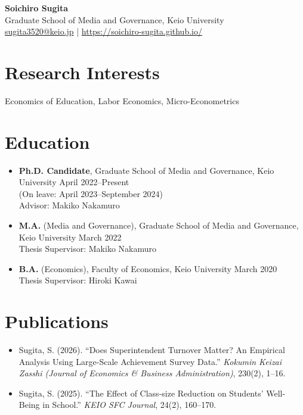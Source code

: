 \documentclass[11pt, a4paper]{article}
\begin{document}
\begin{center}
  {\LARGE \textbf{Soichiro Sugita}} \\[6pt]
  Graduate School of Media and Governance, Keio University \\[3pt]
  \href{mailto:sugita3520@keio.jp}{sugita3520@keio.jp} \quad | \quad
  \href{https://soichiro-sugita.github.io/}{https://soichiro-sugita.github.io/}
\end{center}

\vspace{4pt}

\section{Research Interests}

Economics of Education, Labor Economics, Micro-Econometrics

\section{Education}

\begin{itemize}
  \item \textbf{Ph.D. Candidate}, Graduate School of Media and Governance, Keio University \hfill April 2022--Present \\
        (On leave: April 2023--September 2024) \\
        Advisor: Makiko Nakamuro

  \item \textbf{M.A.} (Media and Governance), Graduate School of Media and Governance, Keio University \hfill March 2022 \\
        Thesis Supervisor: Makiko Nakamuro

  \item \textbf{B.A.} (Economics), Faculty of Economics, Keio University \hfill March 2020 \\
        Thesis Supervisor: Hiroki Kawai
\end{itemize}

\section{Publications}

\begin{itemize}
  \item Sugita, S. (2026). ``Does Superintendent Turnover Matter? An Empirical Analysis Using Large-Scale Achievement Survey Data.'' \textit{Kokumin Keizai Zasshi (Journal of Economics \& Business Administration)}, 230(2), 1--16.

  \item Sugita, S. (2025). ``The Effect of Class-size Reduction on Students' Well-Being in School.'' \textit{KEIO SFC Journal}, 24(2), 160--170.
\end{itemize}
\end{document}
